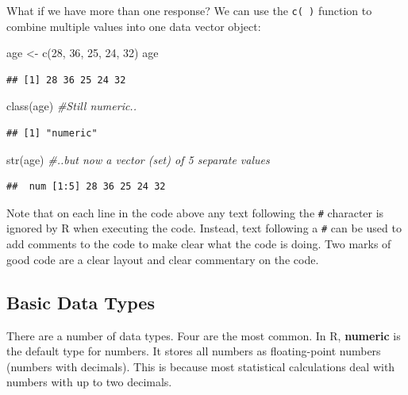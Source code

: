 \documentclass[
]{book}
\newenvironment{Shaded}{\begin{snugshade}}{\end{snugshade}}
\newcommand{\CommentTok}[1]{\textcolor[rgb]{0.56,0.35,0.01}{\textit{#1}}}
\newcommand{\DecValTok}[1]{\textcolor[rgb]{0.00,0.00,0.81}{#1}}
\newcommand{\FunctionTok}[1]{\textcolor[rgb]{0.00,0.00,0.00}{#1}}
\newcommand{\NormalTok}[1]{#1}
\newcommand{\OtherTok}[1]{\textcolor[rgb]{0.56,0.35,0.01}{#1}}
\begin{document}
What if we have more than one response? We can use the \texttt{c(\ )} function to combine multiple values into one data vector object:

\begin{Shaded}
\begin{Highlighting}[]
\NormalTok{age }\OtherTok{\textless{}{-}} \FunctionTok{c}\NormalTok{(}\DecValTok{28}\NormalTok{, }\DecValTok{36}\NormalTok{, }\DecValTok{25}\NormalTok{, }\DecValTok{24}\NormalTok{, }\DecValTok{32}\NormalTok{)}
\NormalTok{age}
\end{Highlighting}
\end{Shaded}

\begin{verbatim}
## [1] 28 36 25 24 32
\end{verbatim}

\begin{Shaded}
\begin{Highlighting}[]
\FunctionTok{class}\NormalTok{(age) }\CommentTok{\#Still numeric..}
\end{Highlighting}
\end{Shaded}

\begin{verbatim}
## [1] "numeric"
\end{verbatim}

\begin{Shaded}
\begin{Highlighting}[]
\FunctionTok{str}\NormalTok{(age) }\CommentTok{\#..but now a vector (set) of 5 separate values}
\end{Highlighting}
\end{Shaded}

\begin{verbatim}
##  num [1:5] 28 36 25 24 32
\end{verbatim}

Note that on each line in the code above any text following the \texttt{\#} character is ignored by R when executing the code. Instead, text following a \texttt{\#} can be used to add comments to the code to make clear what the code is doing. Two marks of good code are a clear layout and clear commentary on the code.

\hypertarget{basic-data-types}{%
\subsection{Basic Data Types}\label{basic-data-types}}

There are a number of data types. Four are the most common. In R, \textbf{numeric} is the default type for numbers. It stores all numbers as floating-point numbers (numbers with decimals). This is because most statistical calculations deal with numbers with up to two decimals.
\end{document}
